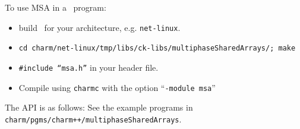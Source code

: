 To use MSA in a \charmpp\ program:
\begin{itemize}
\item build \charmpp\ for your architecture, e.g. \texttt{net-linux}.
\item \texttt{cd charm/net-linux/tmp/libs/ck-libs/multiphaseSharedArrays/; make}
\item \texttt{\#include ``msa.h''} in your header file.
\item Compile using \texttt{charmc} with the option ``\texttt{-module
      msa}''
\end{itemize}

The API is as follows: See the example programs in
\texttt{charm/pgms/charm++/multiphaseSharedArrays}.
